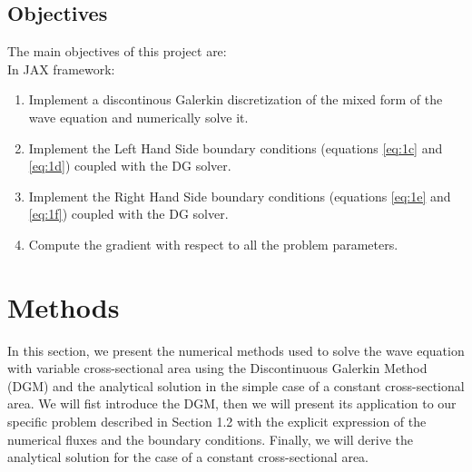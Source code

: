 \documentclass[11pt,a4paper]{report}
\theoremstyle{plain}
\theoremstyle{definition}
\begin{document}
\section{Objectives}
The main objectives of this project are: \\
In JAX framework:
\begin{enumerate}
    \item Implement a discontinous Galerkin discretization of the mixed form of the wave equation and numerically solve it.
    \item Implement the Left Hand Side boundary conditions (equations \eqref{eq:1c} and \eqref{eq:1d}) coupled with the DG solver.
    \item Implement the Right Hand Side boundary conditions (equations \eqref{eq:1e} and \eqref{eq:1f}) coupled with the DG solver.
    \item Compute the gradient with respect to all the problem parameters.   
\end{enumerate}

\newpage
\chapter{Methods}
\minitoc
\vspace{1em}
In this section, we present the numerical methods used to solve the wave equation with variable cross-sectional area
using the Discontinuous Galerkin Method (DGM) and the analytical solution in the simple case of a constant cross-sectional area.
We will fist introduce the DGM, then we will present its application to our specific problem described in Section 1.2 with 
the explicit expression of the numerical fluxes and the boundary conditions.
Finally, we will derive the analytical solution for the case of a constant cross-sectional area.

\newpage
\end{document}
